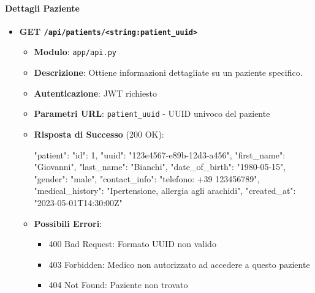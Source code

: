 \documentclass[12pt,a4paper,oneside]{report}
\begin{document}
\paragraph{Dettagli Paziente}
\begin{itemize}
    \item \textbf{GET \texttt{/api/patients/<string:patient\_uuid>}}
          \begin{itemize}
              \item \textbf{Modulo}: \texttt{app/api.py}
              \item \textbf{Descrizione}: Ottiene informazioni dettagliate su un paziente specifico.
              \item \textbf{Autenticazione}: JWT richiesto
              \item \textbf{Parametri URL}: \texttt{patient\_uuid} - UUID univoco del paziente
              \item \textbf{Risposta di Successo} (200 OK):
                    \begin{spverbatim}
                        {
                        "patient": {
                        "id": 1,
                        "uuid": "123e4567-e89b-12d3-a456",
                        "first_name": "Giovanni",
                        "last_name": "Bianchi",
                        "date_of_birth": "1980-05-15",
                        "gender": "male",
                        "contact_info": "telefono: +39 123456789",
                        "medical_history": "Ipertensione, allergia agli arachidi",
                        "created_at": "2023-05-01T14:30:00Z"
                        }
                        }
                    \end{spverbatim}
              \item \textbf{Possibili Errori}:
                    \begin{itemize}
                        \item 400 Bad Request: Formato UUID non valido
                        \item 403 Forbidden: Medico non autorizzato ad accedere a questo paziente
                        \item 404 Not Found: Paziente non trovato
                    \end{itemize}
          \end{itemize}
\end{itemize}
\end{document}
